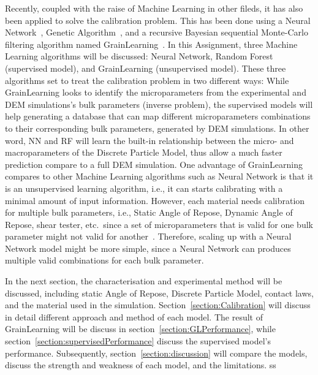Recently, coupled with the raise of Machine Learning in other fileds, it has also been applied to solve the calibration problem. This has been done using a Neural Network~\cite{nn-calibration, NN-GA, NN-coarse, YE2019292}, Genetic Algorithm~\cite{ga-calibration}, and a recursive Bayesian sequential Monte-Carlo filtering algorithm named GrainLearning~\cite{grainLearning}. In this Assignment, three Machine Learning algorithms will be discussed: Neural Network, Random Forest (supervised model), and GrainLearning (unsupervised model). These three algorithms set to treat the calibration problem in two different ways: While GrainLearning looks to identify the microparameters from the experimental and DEM simulations's bulk parameters (inverse problem), the supervised models will help generating a database that can map different microparameters combinations to their corresponding bulk parameters, generated by DEM simulations. In other word, NN and RF will learn the built-in relationship between the micro- and macroparameters of the Discrete Particle Model, thus allow a much faster prediction compare to a full DEM simulation. One advantage of GrainLearning compares to other Machine Learning algorithms such as Neural Network is that it is an unsupervised learning algorithm, i.e., it can starts calibrating with a minimal amount of input information. However, each material needs calibration for multiple bulk parameters, i.e., Static Angle of Repose, Dynamic Angle of Repose, shear tester, etc.~since a set of microparameters that is valid for one bulk parameter might not valid for another~\cite{reviewCalibration}. Therefore, scaling up with a Neural Network model might be more simple, since a Neural Network can produces multiple valid combinations for each bulk parameter.  

In the next section, the characterisation and experimental method will be discussed, including static Angle of Repose, Discrete Particle Model, contact laws, and the material used in the simulation. Section~\ref{section:Calibration} will discuss in detail different approach and method of each model. The result of GrainLearning will be discuss in section~\ref{section:GLPerformance}, while section~\ref{section:supervisedPerformance} discuss the supervised model's performance. Subsequently, section~\ref{section:discussion} will compare the models, discuss the strength and weakness of each model, and the limitations.  ss
